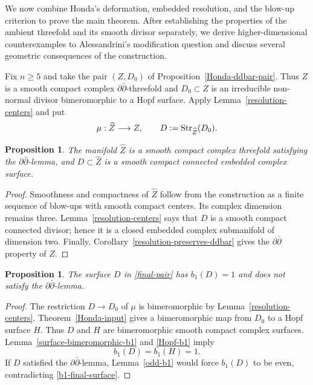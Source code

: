 \documentclass[11pt]{amsart}
\numberwithin{equation}{section}
\def\Str{{\rm Str}}
\theoremstyle{plain}
\newtheorem{prop}[thm]{Proposition}
\theoremstyle{definition}
\begin{document}
We now combine Honda's deformation, embedded resolution, and the blow-up
criterion to prove the main theorem.  After establishing the properties of
the ambient threefold and its smooth divisor separately, we derive
higher-dimensional counterexamples to Alessandrini's modification question
and discuss several geometric consequences of the construction.

Fix $n\geq5$ and take the pair
$(Z,D_0)$ of Proposition~\ref{Honda-ddbar-pair}.  Thus $Z$ is a smooth compact
complex $\partial\bar\partial$-threefold and $D_0\subset Z$ is an irreducible
non-normal divisor bimeromorphic to a Hopf surface.  Apply
Lemma~\ref{resolution-centers} and put
\begin{equation}\label{final-pair}
 \mu:\widehat Z\longrightarrow Z,
 \qquad D:=\Str_{\widehat Z}(D_0).
\end{equation}

\begin{prop}\label{ambient-properties}
The manifold $\widehat Z$ is a smooth compact complex threefold satisfying the
$\partial\bar\partial$-lemma, and $D\subset\widehat Z$ is a smooth compact
connected embedded complex surface.
\end{prop}

\begin{proof}
Smoothness and compactness of $\widehat Z$ follow from the construction as a
finite sequence of blow-ups with smooth compact centers.  Its complex
dimension remains three.  Lemma~\ref{resolution-centers} says that $D$ is a
smooth compact connected divisor; hence it is a closed embedded complex
submanifold of dimension two.  Finally,
Corollary~\ref{resolution-preserves-ddbar} gives the
$\partial\bar\partial$ property of
$\widehat Z$.
\end{proof}

\begin{prop}\label{surface-properties}
The surface $D$ in \eqref{final-pair} has $b_1(D)=1$ and does not satisfy the
$\partial\bar\partial$-lemma.
\end{prop}

\begin{proof}
The restriction $D\to D_0$ of $\mu$ is bimeromorphic by
Lemma~\ref{resolution-centers}.  Theorem~\ref{Honda-input} gives a
bimeromorphic map
from $D_0$ to a Hopf surface $H$.  Thus $D$ and $H$ are bimeromorphic smooth
compact complex surfaces.  Lemma~\ref{surface-bimeromorphic-b1} and
\eqref{Hopf-b1} imply
\begin{equation}\label{b1-final-surface}
 b_1(D)=b_1(H)=1.
\end{equation}
If $D$ satisfied the $\partial\bar\partial$-lemma, Lemma~\ref{odd-b1} would
force $b_1(D)$ to be even, contradicting \eqref{b1-final-surface}.
\end{proof}
\end{document}

